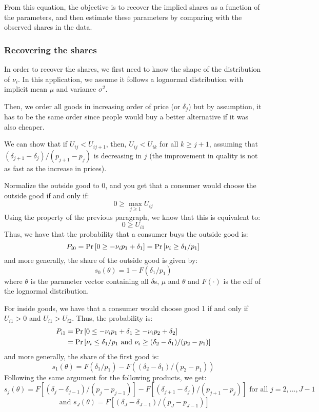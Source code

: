 From this equation, the objective is to recover the implied shares as a function of the parameters, and then estimate these parameters by comparing with the observed shares in the data.

\subsubsection{Recovering the shares}

In order to recover the shares, we first need to know the shape of the distribution of $\nu_i$. In this application, we assume it follows a lognormal distribution with implicit mean $\mu$ and variance $\sigma^2$. 

Then, we order all goods in increasing order of price (or $\delta_j$) but by assumption, it has to be the same order since people would buy a better alternative if it was also cheaper.

We can show that if $U_{ij} < U_{ij+1}$, then, $U_{ij} < U_{ik}$ for all $k \geq j+1$, assuming that $(\delta_{j+1} - \delta_j)/(p_{j+1} - p_j)$ is decreasing in $j$ (the improvement in quality is not as fast as the increase in prices).

Normalize the outside good to 0, and you get that a consumer would choose the outside good if and only if: $$ 0 \geq \max_{j\geq 1} U_{ij} $$ Using the property of the previous paragraph, we know that this is equivalent to: $$ 0 \geq U_{i1} $$ Thus, we have that the probability that a consumer buys the outside good is: $$ P_{i0} = \operatorname{Pr}\left[0 \geq -\nu_ip_1 + \delta_1\right] = \operatorname{Pr}\left[\nu_i \geq \delta_1/p_1\right] $$ and more generally, the share of the outside good is given by: $$ s_0(\theta) = 1 - F(\delta_1/p_1) $$ where $\theta$ is the parameter vector containing all $\delta$s, $\mu$ and $\theta$ and $F(\cdot)$ is the cdf of the lognormal distribution.

For inside goods, we have that a consumer would choose good 1 if and only if $U_{i1} > 0$ and $U_{i1} > U_{i2}$. Thus, the probability is: \begin{align*}
P_{i1} & = \operatorname{Pr}\left[0 \leq -\nu_ip_1 + \delta_1 \geq -\nu_ip_2 + \delta_2\right] \\ & = \operatorname{Pr}\left[\nu_i \leq \delta_1/p_1 \text{ and } \nu_i \geq (\delta_2 - \delta_1)/(p_2 - p_1) \right]
\end{align*}
and more generally, the share of the first good is: $$s_1(\theta) = F(\delta_1/p_1) - F((\delta_2 - \delta_1)/(p_2 - p_1)) $$
Following the same argument for the following products, we get: $$ s_j(\theta) = F[(\delta_j - \delta_{j-1})/(p_j - p_{j-1})] - F[(\delta_{j+1} - \delta_j)/(p_{j+1} - p_j)] \text{ for all } j=2, ..., J-1 $$
$$ \text{ and } s_J(\theta) = F[(\delta_J - \delta_{J-1})/(p_J - p_{J-1})] $$

